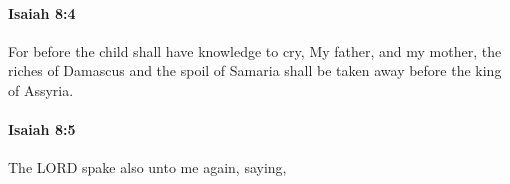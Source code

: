 		\paragraph{Isaiah 8:4} %
			\label{ISAIAH-8-4}

			For before the child shall have knowledge to cry, My father, and my mother, the riches of Damascus and the spoil of Samaria shall be taken away before the king of Assyria.


		\paragraph{Isaiah 8:5} %
			\label{ISAIAH-8-5}

			The LORD spake also unto me again, saying,


